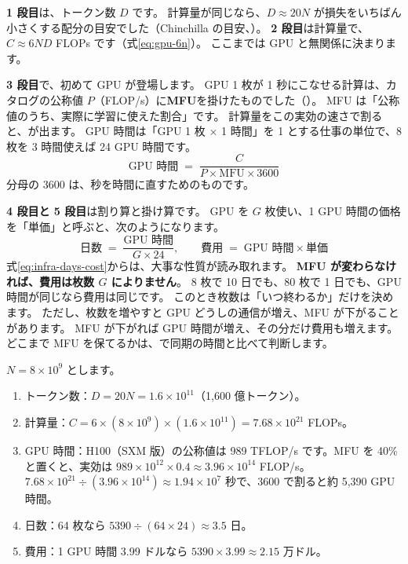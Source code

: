 \textbf{1 段目}は、トークン数 $D$ です。
計算量が同じなら、$D\approx 20N$ が損失をいちばん小さくする配分の目安でした（Chinchilla の目安、）。
\textbf{2 段目}は計算量で、$C\approx 6ND$ FLOPs です（式\eqref{eq:gpu-6n}）。
ここまでは GPU と無関係に決まります。

\textbf{3 段目}で、初めて GPU が登場します。
GPU 1 枚が 1 秒にこなせる計算は、カタログの公称値 $P$（FLOP/s）に\textbf{MFU}を掛けたものでした（）。
MFU は「公称値のうち、実際に学習に使えた割合」です。
計算量をこの実効の速さで割ると、が出ます。
GPU 時間は「GPU 1 枚 $\times$ 1 時間」を 1 とする仕事の単位で、8 枚を 3 時間使えば 24 GPU 時間です。
\begin{equation}
\text{GPU 時間} \;=\; \frac{C}{P \times \mathrm{MFU} \times 3600}
\label{eq:infra-gpuhours}
\end{equation}
分母の 3600 は、秒を時間に直すためのものです。

\textbf{4 段目と 5 段目}は割り算と掛け算です。
GPU を $G$ 枚使い、1 GPU 時間の価格を「単価」と呼ぶと、次のようになります。
\begin{equation}
\text{日数} \;=\; \frac{\text{GPU 時間}}{G \times 24}, \qquad
\text{費用} \;=\; \text{GPU 時間} \times \text{単価}
\label{eq:infra-days-cost}
\end{equation}
式\eqref{eq:infra-days-cost}からは、大事な性質が読み取れます。
\textbf{MFU が変わらなければ、費用は枚数 $G$ によりません}。
8 枚で 10 日でも、80 枚で 1 日でも、GPU 時間が同じなら費用は同じです。
このとき枚数は「いつ終わるか」だけを決めます。
ただし、枚数を増やすと GPU どうしの通信が増え、MFU が下がることがあります。
MFU が下がれば GPU 時間が増え、その分だけ費用も増えます。
どこまで MFU を保てるかは、で同期の時間と比べて判断します。

\begin{example}[80 億パラメータのモデルを手で見積もる]\label{ex:infra-8b}
$N=8\times10^{9}$ とします。
\begin{enumerate}
\item トークン数：$D=20N=1.6\times10^{11}$（1,600 億トークン）。
\item 計算量：$C=6\times(8\times10^{9})\times(1.6\times10^{11})=7.68\times10^{21}$ FLOPs。
\item GPU 時間：H100（SXM 版）の公称値は 989 TFLOP/s です。MFU を 40\% と置くと、実効は $989\times10^{12}\times0.4\approx3.96\times10^{14}$ FLOP/s。
$7.68\times10^{21}\div(3.96\times10^{14})\approx1.94\times10^{7}$ 秒で、3600 で割ると約 5,390 GPU 時間。
\item 日数：64 枚なら $5390\div(64\times24)\approx3.5$ 日。
\item 費用：1 GPU 時間 3.99 ドルなら $5390\times3.99\approx2.15$ 万ドル。
\end{enumerate}
\end{example}

